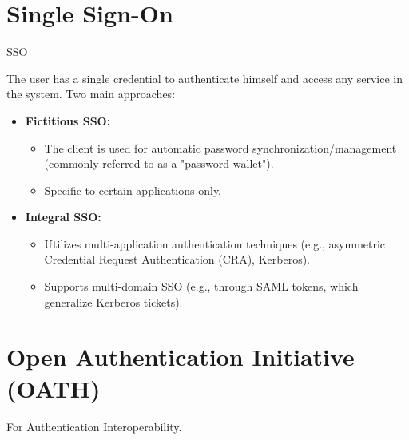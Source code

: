 \section{Single Sign-On}
\begin{center}
    SSO
\end{center}
The user has a single credential to authenticate himself and access any service in the system.
Two main approaches:
\begin{itemize}
    \item \textbf{Fictitious SSO:}
    \begin{itemize}
        \item The client is used for automatic password synchronization/management (commonly referred to as a "password wallet").
        \item Specific to certain applications only.
    \end{itemize}
    \item \textbf{Integral SSO:}
    \begin{itemize}
        \item Utilizes multi-application authentication techniques (e.g., asymmetric Credential Request Authentication (CRA), Kerberos).
        \item Supports multi-domain SSO (e.g., through SAML tokens, which generalize Kerberos tickets).
    \end{itemize}
\end{itemize}
\section{Open Authentication Initiative (OATH)}
\begin{center}
    For Authentication Interoperability.
\end{center}


